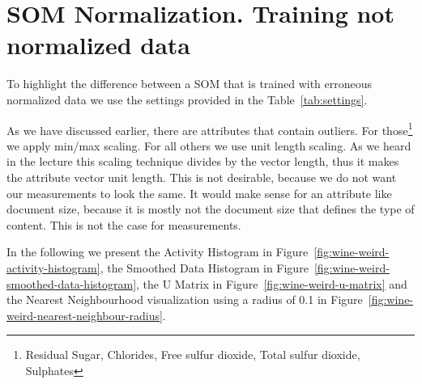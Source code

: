 \documentclass{acm_proc_article-sp}
\begin{document}
\section{SOM Normalization. Training not normalized data}

To highlight the difference between a SOM that is trained with erroneous normalized data
we use the settings provided in the Table~\ref{tab:settings}.

As we have discussed earlier, there are attributes that contain outliers.
For those\footnote{Residual Sugar, Chlorides, Free sulfur dioxide, Total sulfur dioxide, Sulphates} we apply min/max scaling.
For all others we use unit length scaling. As we heard in the lecture this scaling technique
divides by the vector length, thus it makes the attribute vector unit length. This is
not desirable, because we do not want our measurements to look the same. It would
make sense for an attribute like document size, because it is mostly not the document
size that defines the type of content. This is not the case for measurements.

In the following we present the Activity Histogram in Figure~\ref{fig:wine-weird-activity-histogram},
the Smoothed Data Histogram in Figure~\ref{fig:wine-weird-smoothed-data-histogram},
the U Matrix in Figure~\ref{fig:wine-weird-u-matrix} and
the Nearest Neighbourhood visualization using a radius of 0.1 in Figure~\ref{fig:wine-weird-nearest-neighbour-radius}.
\end{document}
